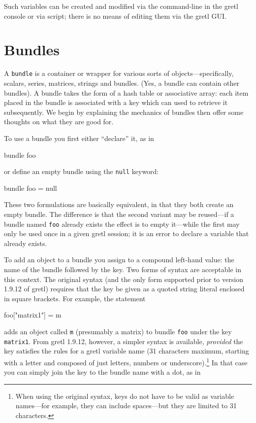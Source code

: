 Such variables can be created and modified via the command-line in
the gretl console or via script; there is no means of editing them
via the gretl GUI.


\section{Bundles}
\label{sec:Bundles}

A \texttt{bundle} is a container or wrapper for various sorts of
objects---specifically, scalars, series, matrices, strings and
bundles. (Yes, a bundle can contain other bundles). A bundle takes the
form of a hash table or associative array: each item placed in the
bundle is associated with a key which can used to retrieve it
subsequently. We begin by explaining the mechanics of bundles then
offer some thoughts on what they are good for.

To use a bundle you first either ``declare'' it, as in
%
\begin{code}
bundle foo
\end{code}
%
or define an empty bundle using the \texttt{null} keyword:
%
\begin{code}
bundle foo = null
\end{code}
%
These two formulations are basically equivalent, in that they both
create an empty bundle. The difference is that the second variant may
be reused---if a bundle named \texttt{foo} already exists the effect
is to empty it---while the first may only be used once in a given
gretl session; it is an error to declare a variable that already
exists.

To add an object to a bundle you assign to a compound left-hand value:
the name of the bundle followed by the key. Two forms of syntax are
acceptable in this context. The original syntax (and the only form
supported prior to version 1.9.12 of gretl) requires that the
key be given as a quoted string literal enclosed in square brackets.
For example, the statement

\begin{code}
foo["matrix1"] = m
\end{code}

adds an object called \texttt{m} (presumably a matrix) to bundle
\texttt{foo} under the key \texttt{matrix1}. From gretl 1.9.12,
however, a simpler syntax is available, \emph{provided} the key
satisfies the rules for a gretl variable name (31 characters maximum,
starting with a letter and composed of just letters, numbers or
underscore).\footnote{When using the original syntax, keys do not have
  to be valid as variable names---for example, they can include
  spaces---but they are limited to 31 characters.}  In that case you
can simply join the key to the bundle name with a dot, as in

